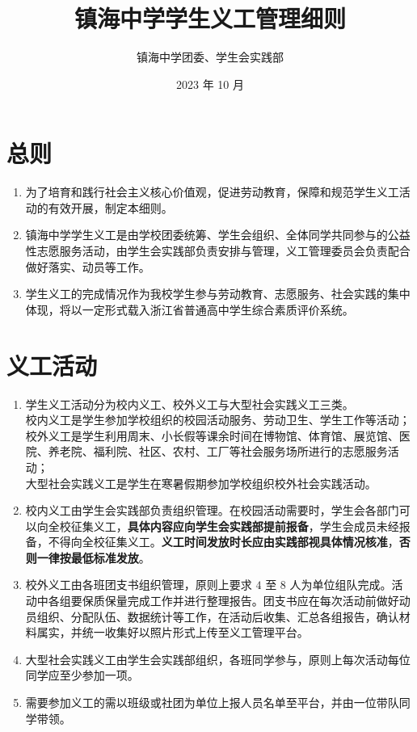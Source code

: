 \documentclass{article}
\title{镇海中学学生义工管理细则}
\author{镇海中学团委、学生会实践部}
\date{2023 年 10 月}
\begin{document}
\maketitle

\section{总则}

\begin{enumerate}[label=\heiti{\textbf{第\chinese*条}}, leftmargin=4em]
  \fangsong
  \item 为了培育和践行社会主义核心价值观，促进劳动教育，保障和规范学生义工活动的有效开展，制定本细则。
  \item 镇海中学学生义工是由学校团委统筹、学生会组织、全体同学共同参与的公益性志愿服务活动，由学生会实践部负责安排与管理，义工管理委员会负责配合做好落实、动员等工作。
  \item 学生义工的完成情况作为我校学生参与劳动教育、志愿服务、社会实践的集中体现，将以一定形式载入浙江省普通高中学生综合素质评价系统。
\end{enumerate}

\section{义工活动}

\begin{enumerate}[resume, label=\heiti{\textbf{第\chinese*条}}, leftmargin=4em]
  \fangsong
  \item 学生义工活动分为校内义工、校外义工与大型社会实践义工三类。\\
  校内义工是学生参加学校组织的校园活动服务、劳动卫生、学生工作等活动；\\
  校外义工是学生利用周末、小长假等课余时间在博物馆、体育馆、展览馆、医院、养老院、福利院、社区、农村、工厂等社会服务场所进行的志愿服务活动；\\
  大型社会实践义工是学生在寒暑假期参加学校组织校外社会实践活动。
  \item 校内义工由学生会实践部负责组织管理。在校园活动需要时，学生会各部门可以向全校征集义工，\textbf{具体内容应向学生会实践部提前报备}，学生会成员未经报备，不得向全校征集义工。\textbf{义工时间发放时长应由实践部视具体情况核准}，\textbf{否则一律按最低标准发放}。
  \item 校外义工由各班团支书组织管理，原则上要求 $4$ 至 $8$ 人为单位组队完成。活动中各组要保质保量完成工作并进行整理报告。团支书应在每次活动前做好动员组织、分配队伍、数据统计等工作，在活动后收集、汇总各组报告，确认材料属实，并统一收集好以照片形式上传至义工管理平台。
  \item 大型社会实践义工由学生会实践部组织，各班同学参与，原则上每次活动每位同学应至少参加一项。
  \item 需要参加义工的需以班级或社团为单位上报人员名单至平台，并由一位带队同学带领。
\end{enumerate}
\end{document}

